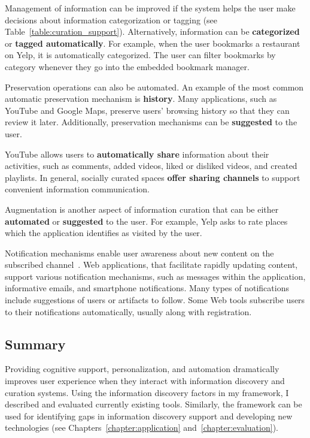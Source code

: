 {{Management of information can be improved if the system helps the user make decisions about information categorization or tagging (see Table~\ref{table:curation_support}). Alternatively, information can be \textbf{categorized} or \textbf{tagged automatically}. For example, when the user bookmarks a restaurant on Yelp, it is automatically categorized. The user can filter bookmarks by category whenever they go into the embedded bookmark manager. 

Preservation operations can also be automated. An example of the most common automatic preservation mechanism is \textbf{history}. Many applications, such as YouTube and Google Maps, preserve users' browsing history so that they can review it later. Additionally, preservation mechanisms can be \textbf{suggested} to the user.

\pagebreak

YouTube allows users to \textbf{automatically share} information about their activities, such as comments,  added videos, liked or disliked videos, and created playlists. In general, socially curated spaces \textbf{offer sharing channels} to support convenient information communication.
 
Augmentation is another aspect of information curation that can be either \textbf{automated} or \textbf{suggested} to the user. For example, Yelp asks to rate places which the application identifies as visited by the user. 

\pagebreak

Notification mechanisms enable user awareness about new content on the subscribed channel~\cite{millen2005social}. Web applications, that facilitate rapidly updating content, support various notification mechanisms, such as messages within the application, informative emails, and smartphone notifications. Many types of notifications include suggestions of users or artifacts to follow. Some Web tools subscribe users to their notifications automatically, usually along with registration.
} %
{\subsection{Summary}
Providing cognitive support, personalization, and automation dramatically improves user experience when they interact with information discovery and curation systems. Using the information discovery factors in my framework, I described and evaluated currently existing tools. Similarly, the framework can be used for identifying gaps in information discovery support and developing new technologies (see Chapters~\ref{chapter:application} and~\ref{chapter:evaluation}).  
}
}







